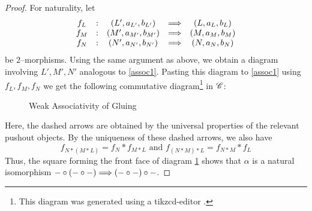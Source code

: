 \documentclass[./Thick_TQFTs_and_Quantum_Information.tex]{subfiles}
\begin{document}
\begin{proof}
For naturality, let
\[
\begin{array}{ccccc}
  f_L & : & (L', a_{L'}, b_{L'}) & \stackrel{}{\Longrightarrow} & (L, a_L, b_L) \\
  f_M & : & (M', a_{M'}, b_{M'}) & \stackrel{}{\Longrightarrow} & (M, a_M, b_M) \\
  f_N & : & (N', a_{N'}, b_{N'}) & \stackrel{}{\Longrightarrow} & (N, a_N, b_N)
\end{array}
\]
be $2$--morphisms. Using the same argument as above, we obtain a diagram
involving $L', M', N'$ analogous to \eqref{assoc1}. Pasting this diagram to
\eqref{assoc1} using $f_L, f_M, f_N$ we get the following commutative
diagram\footnote{This diagram was generated using a tikzcd-editor
\cite{tikzcdeditor}.} in $\mathscr{C}$:
\begin{figure}[H]\label{fig:glue_assoc}
\begin{center}
\begin{scriptsize}

\end{scriptsize}
\end{center}
\caption{Weak Associativity of Gluing}
\end{figure}
Here, the dashed arrows are obtained by the universal properties of the relevant
pushout objects. By the uniqueness of these dashed arrows, we also have
\[
  f_{N * (M * L)} = f_N * f_{M * L}  \text{ and }
  f_{(N * M) * L} = f_{N * M} * f_L
\]
Thus, the square forming the front face of diagram \ref{fig:glue_assoc} shows
that $\alpha$ is a natural isomorphism
$- \circ (- \circ -) \stackrel{}{\Longrightarrow} (- \circ -) \circ -$.

\end{proof}
\end{document}

